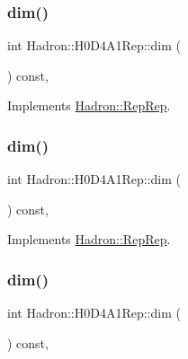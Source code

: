 \subsubsection{\texorpdfstring{dim()}{dim()}\hspace{0.1cm}{\footnotesize\ttfamily [3/5]}}
{\footnotesize\ttfamily int Hadron\+::\+H0\+D4\+A1\+Rep\+::dim (\begin{DoxyParamCaption}{ }\end{DoxyParamCaption}) const\hspace{0.3cm}{\ttfamily [inline]}, {\ttfamily [virtual]}}



Implements \mbox{\hyperlink{structHadron_1_1RepRep_a92c8802e5ed7afd7da43ccfd5b7cd92b}{Hadron\+::\+Rep\+Rep}}.

\mbox{\label{structHadron_1_1H0D4A1Rep_ac5a45aa7f7cdc3ab70b8c164b2e1dce0}} 
\subsubsection{\texorpdfstring{dim()}{dim()}\hspace{0.1cm}{\footnotesize\ttfamily [4/5]}}
{\footnotesize\ttfamily int Hadron\+::\+H0\+D4\+A1\+Rep\+::dim (\begin{DoxyParamCaption}{ }\end{DoxyParamCaption}) const\hspace{0.3cm}{\ttfamily [inline]}, {\ttfamily [virtual]}}



Implements \mbox{\hyperlink{structHadron_1_1RepRep_a92c8802e5ed7afd7da43ccfd5b7cd92b}{Hadron\+::\+Rep\+Rep}}.

\mbox{\label{structHadron_1_1H0D4A1Rep_ac5a45aa7f7cdc3ab70b8c164b2e1dce0}} 
\subsubsection{\texorpdfstring{dim()}{dim()}\hspace{0.1cm}{\footnotesize\ttfamily [5/5]}}
{\footnotesize\ttfamily int Hadron\+::\+H0\+D4\+A1\+Rep\+::dim (\begin{DoxyParamCaption}{ }\end{DoxyParamCaption}) const\hspace{0.3cm}{\ttfamily [inline]}, {\ttfamily [virtual]}}



